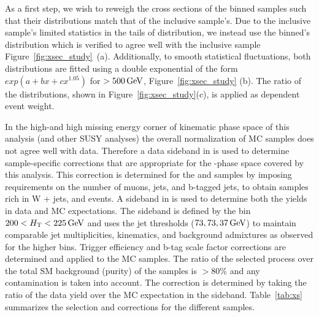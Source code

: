 
As a first step, we wish to reweigh the cross sections of the \partonht binned samples such that
their \partonht distributions match that of the inclusive sample's. Due to
the inclusive sample's limited statistics in the tails of \scalht distribution, 
we instead use the \nparton binned's \partonht distribution which is verified to agree well 
with the inclusive sample Figure~\ref{fig:xsec_study}~(a).  Additionally, to smooth statistical
fluctuations, both distributions are fitted using a double exponential of the form $exp(a+bx + cx^{1.05})$
for \scalht $> 500\,\text{Ge\hspace{-.08em}V}$, Figure~\ref{fig:xsec_study} (b). The ratio of the distributions,
shown in Figure~\ref{fig:xsec_study}(c), is applied as \partonht dependent event weight.

In the high-\scalht and high missing energy corner of kinematic phase space of this analysis 
(and other SUSY analyses) the overall normalization of MC samples does not 
agree well with data. Therefore a data sideband in \scalht is used
to determine sample-specific corrections that are appropriate for the
\scalht-\met phase space covered by this analysis. This correction is determined 
for the \wlnu and \ttbar samples by imposing requirements on the number of muons, 
jets, and b-tagged jets, to obtain samples rich in W + jets, and \ttbar events.
A sideband in \scalht is used to determine both the yields in data and
MC expectations. The sideband is defined by the bin $200 < \mbox{$H_\text{T}$}
< 225\,\text{Ge\hspace{-.08em}V}$ and uses the jet \pt thresholds ($73,73,37\,\text{Ge\hspace{-.08em}V}$) to maintain 
comparable jet multiplicities, kinematics, and background admixtures as observed for the
higher \scalht bins. Trigger efficiency and b-tag scale factor corrections 
are determined and applied to the MC samples. The ratio of the selected process 
over the total SM background (purity) of the samples is $>80\%$ and
any contamination is taken into account. The correction is determined by 
taking the ratio of the data yield over the MC expectation in the sideband. 
Table~\ref{tab:xs} summarizes the selection and corrections for the different samples. 

